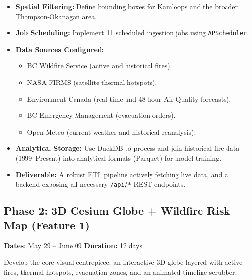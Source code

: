 \documentclass[12pt,letterpaper]{article}
\begin{document}
\begin{itemize}
    \item \textbf{Spatial Filtering:} Define bounding boxes for Kamloops and the broader Thompson-Okanagan area.
    \item \textbf{Job Scheduling:} Implement 11 scheduled ingestion jobs using \texttt{APScheduler}.
    \item \textbf{Data Sources Configured:}
    \begin{itemize}
        \item BC Wildfire Service (active and historical fires).
        \item NASA FIRMS (satellite thermal hotspots).
        \item Environment Canada (real-time and 48-hour Air Quality forecasts).
        \item BC Emergency Management (evacuation orders).
        \item Open-Meteo (current weather and historical reanalysis).
    \end{itemize}
    \item \textbf{Analytical Storage:} Use DuckDB to process and join historical fire data (1999--Present) into analytical formats (Parquet) for model training.
    \item \textbf{Deliverable:} A robust ETL pipeline actively fetching live data, and a backend exposing all necessary \texttt{/api/*} REST endpoints.
\end{itemize}

\subsection*{Phase 2: 3D Cesium Globe + Wildfire Risk Map (Feature 1)}
\textbf{Dates:} May 29 -- June 09 \hfill \textbf{Duration:} 12 days

\begin{goalbox}
Develop the core visual centrepiece: an interactive 3D globe layered with active fires, thermal hotspots, evacuation zones, and an animated timeline scrubber.
\end{goalbox}
\end{document}
